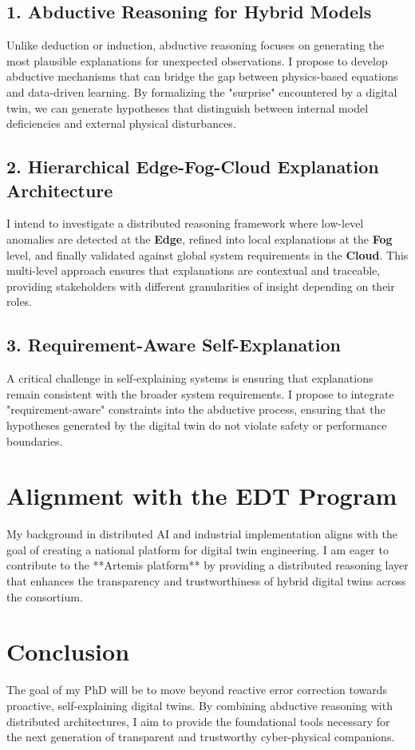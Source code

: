 \documentclass[a4paper,11pt]{article}
\begin{document}
\subsection{1. Abductive Reasoning for Hybrid Models}
Unlike deduction or induction, abductive reasoning focuses on generating the most plausible explanations for unexpected observations. I propose to develop abductive mechanisms that can bridge the gap between physics-based equations and data-driven learning. By formalizing the "surprise" encountered by a digital twin, we can generate hypotheses that distinguish between internal model deficiencies and external physical disturbances.

\subsection{2. Hierarchical Edge-Fog-Cloud Explanation Architecture}
I intend to investigate a distributed reasoning framework where low-level anomalies are detected at the \textbf{Edge}, refined into local explanations at the \textbf{Fog} level, and finally validated against global system requirements in the \textbf{Cloud}. This multi-level approach ensures that explanations are contextual and traceable, providing stakeholders with different granularities of insight depending on their roles.

\subsection{3. Requirement-Aware Self-Explanation}
A critical challenge in self-explaining systems is ensuring that explanations remain consistent with the broader system requirements. I propose to integrate "requirement-aware" constraints into the abductive process, ensuring that the hypotheses generated by the digital twin do not violate safety or performance boundaries.

\section{Alignment with the EDT Program}
My background in distributed AI and industrial implementation aligns with the goal of creating a national platform for digital twin engineering. I am eager to contribute to the **Artemis platform** by providing a distributed reasoning layer that enhances the transparency and trustworthiness of hybrid digital twins across the consortium.

\section{Conclusion}
The goal of my PhD will be to move beyond reactive error correction towards proactive, self-explaining digital twins. By combining abductive reasoning with distributed architectures, I aim to provide the foundational tools necessary for the next generation of transparent and trustworthy cyber-physical companions.
\end{document}

